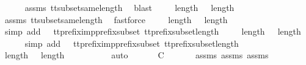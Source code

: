 \ \ \ \ \isamarkupfalse%
\ {\isasymrho}{\isacharprime}{\isacharprime}{\isacharprime}{\isacharunderscore}assms\ tt{\isacharunderscore}subset{\isacharunderscore}same{\isacharunderscore}length\ \isamarkupfalse%
\ blast\isanewline
\ \ \isamarkupfalse%
\ {}{\isacharcolon}\ {\isachardoublequoteopen}length\ {\isasymrho}\ {\isacharequal}\ length\ {\isasymrho}{\isacharprime}{\isacharprime}{\isachardoublequoteclose}\isanewline
\ \ \ \ \isamarkupfalse%
\ {\isasymrho}{\isacharprime}{\isacharprime}{\isacharunderscore}assms\ tt{\isacharunderscore}subset{\isacharunderscore}same{\isacharunderscore}length\ \isamarkupfalse%
\ fastforce\isanewline
\ \ \isamarkupfalse%
\ {}{\isacharcolon}\ {\isachardoublequoteopen}length\ {\isasymrho}\ {\isasymle}\ length\ {\isasymrho}{\isacharprime}{\isachardoublequoteclose}\isanewline
\ \ \ \ \isamarkupfalse%
\ {\isacharparenleft}simp\ add{\isacharcolon}\ {\isachardoublequoteopen}{}{\isachardoublequoteclose}\ {\isachardoublequoteopen}{}{\isachardoublequoteclose}\ tt{\isacharunderscore}prefix{\isacharunderscore}imp{\isacharunderscore}prefix{\isacharunderscore}subset\ tt{\isacharunderscore}prefix{\isacharunderscore}subset{\isacharunderscore}length{\isacharparenright}\isanewline
\ \ \isamarkupfalse%
\ {}{\isacharcolon}\ {\isachardoublequoteopen}length\ {\isasymrho}{\isacharprime}\ {\isasymle}\ length\ {\isasymrho}{\isachardoublequoteclose}\isanewline
\ \ \ \ \isamarkupfalse%
\ {\isacharparenleft}simp\ add{\isacharcolon}\ {\isachardoublequoteopen}{}{\isachardoublequoteclose}\ {\isachardoublequoteopen}{}{\isachardoublequoteclose}\ tt{\isacharunderscore}prefix{\isacharunderscore}imp{\isacharunderscore}prefix{\isacharunderscore}subset\ tt{\isacharunderscore}prefix{\isacharunderscore}subset{\isacharunderscore}length{\isacharparenright}\isanewline
\ \ \isamarkupfalse%
\ {\isachardoublequoteopen}length\ {\isasymrho}{\isacharprime}\ {\isacharequal}\ length\ {\isasymrho}{\isachardoublequoteclose}\isanewline
\ \ \ \ \isamarkupfalse%
\ {}\ {}\ \isamarkupfalse%
\ auto\isanewline
\ \ \isamarkupfalse%
\ \isamarkupfalse%
\ {\isachardoublequoteopen}{\isasymrho}{\isacharprime}\ {\isasymsubseteq}\isactrlsub C\ {\isasymrho}{\isachardoublequoteclose}\isanewline
\ \ \ \ \isamarkupfalse%
\ assms{\isacharparenleft}{}{\isacharparenright}\ assms{\isacharparenleft}{}{\isacharparenright}\ assms{\isacharparenleft}{}{\isacharparenright}\ \isamarkupfalse%
